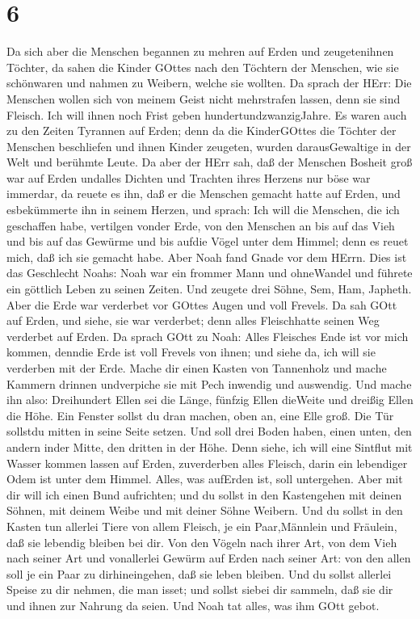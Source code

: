 \hypertarget{section-5}{%
\section{6}\label{section-5}}

 Da sich aber die Menschen begannen zu mehren auf Erden und
zeugetenihnen Töchter,  da sahen die Kinder GOttes nach den
Töchtern der Menschen, wie sie schönwaren und nahmen zu Weibern, welche
sie wollten.  Da sprach der HErr: Die Menschen wollen sich
von meinem Geist nicht mehrstrafen lassen, denn sie sind Fleisch. Ich
will ihnen noch Frist geben hundertundzwanzigJahre.  Es
waren auch zu den Zeiten Tyrannen auf Erden; denn da die KinderGOttes
die Töchter der Menschen beschliefen und ihnen Kinder zeugeten, wurden
darausGewaltige in der Welt und berühmte Leute.  Da aber der
HErr sah, daß der Menschen Bosheit groß war auf Erden undalles Dichten
und Trachten ihres Herzens nur böse war immerdar,  da reuete
es ihn, daß er die Menschen gemacht hatte auf Erden, und esbekümmerte
ihn in seinem Herzen,  und sprach: Ich will die Menschen,
die ich geschaffen habe, vertilgen vonder Erde, von den Menschen an bis
auf das Vieh und bis auf das Gewürme und bis aufdie Vögel unter dem
Himmel; denn es reuet mich, daß ich sie gemacht habe.  Aber
Noah fand Gnade vor dem HErrn.  Dies ist das Geschlecht
Noahs: Noah war ein frommer Mann und ohneWandel und führete ein göttlich
Leben zu seinen Zeiten.  Und zeugete drei Söhne, Sem, Ham,
Japheth.  Aber die Erde war verderbet vor GOttes Augen und
voll Frevels.  Da sah GOtt auf Erden, und siehe, sie war
verderbet; denn alles Fleischhatte seinen Weg verderbet auf Erden.
 Da sprach GOtt zu Noah: Alles Fleisches Ende ist vor mich
kommen, denndie Erde ist voll Frevels von ihnen; und siehe da, ich will
sie verderben mit der Erde.  Mache dir einen Kasten von
Tannenholz und mache Kammern drinnen undverpiche sie mit Pech inwendig
und auswendig.  Und mache ihn also: Dreihundert Ellen sei
die Länge, fünfzig Ellen dieWeite und dreißig Ellen die Höhe.
 Ein Fenster sollst du dran machen, oben an, eine Elle
groß. Die Tür sollstdu mitten in seine Seite setzen. Und soll drei Boden
haben, einen unten, den andern inder Mitte, den dritten in der Höhe.
 Denn siehe, ich will eine Sintflut mit Wasser kommen
lassen auf Erden, zuverderben alles Fleisch, darin ein lebendiger Odem
ist unter dem Himmel. Alles, was aufErden ist, soll untergehen.
 Aber mit dir will ich einen Bund aufrichten; und du sollst
in den Kastengehen mit deinen Söhnen, mit deinem Weibe und mit deiner
Söhne Weibern.  Und du sollst in den Kasten tun allerlei
Tiere von allem Fleisch, je ein Paar,Männlein und Fräulein, daß sie
lebendig bleiben bei dir.  Von den Vögeln nach ihrer Art,
von dem Vieh nach seiner Art und vonallerlei Gewürm auf Erden nach
seiner Art: von den allen soll je ein Paar zu dirhineingehen, daß sie
leben bleiben.  Und du sollst allerlei Speise zu dir
nehmen, die man isset; und sollst siebei dir sammeln, daß sie dir und
ihnen zur Nahrung da seien.  Und Noah tat alles, was ihm
GOtt gebot.

